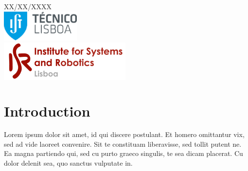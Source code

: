 \begin{titlepage}


{\large XX/XX/XXXX}\\[2cm] %


\includegraphics{img/ist-logo.png}\\[0.5cm] %

\includegraphics{img/isr-logo.png}\\[0.5cm] %
 

\vfill %

\end{titlepage}

\section{Introduction}

Lorem ipsum dolor sit amet, id qui discere postulant. Et homero omittantur vix, sed ad vide laoreet convenire. Sit te constituam liberavisse, sed tollit putent ne. Ea magna partiendo qui, sed cu purto graeco singulis, te sea dicam placerat. Cu dolor delenit sea, quo sanctus vulputate in.

